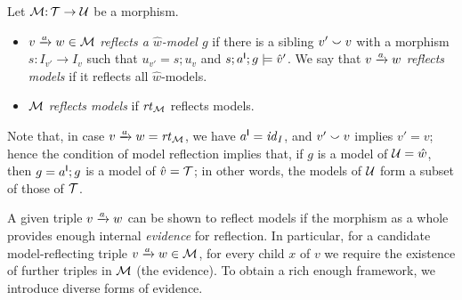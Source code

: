 \begin{definition}
Let ${\mathcal{M}}{:}\, {\mathcal{T}}\rightarrow{\mathcal{U}}$ be a morphism.
\begin{itemize}[topsep=\itemsep]
\item $\trip vaw\in\cM$ \emph{reflects a $\hat w$-model $g$} if there is a sibling $v'\smallsmile v$ with a morphism $s:I_{v'}\to I_v$ such that $u_{v'}=s;u_v$ and $s;a^{\mathsf I};g\models \hat v'$. We say that $\trip vaw$ \emph{reflects models} if it reflects all $\hat w$-models.

\item ${\mathcal{M}}$ \emph{reflects models} if $\mathit{rt}_{{\mathcal{M}}}$ reflects models.
\end{itemize}
\end{definition}
%
Note that, in case $\trip vaw=\rt\cM$, we have $a^{\mathsf I}={\mathit{id}}_I$, and $v'\smallsmile v$ implies $v'=v$; hence the condition of model reflection implies that, if $g$ is a model of ${\mathcal{U}}=\hat w$, then $g=a^{\mathsf I};g$ is a model of $\hat v={\mathcal{T}}$; in other words, the models of ${\mathcal{U}}$ form a subset of those of ${\mathcal{T}}$.

\begin{comment}
\todo[inline]{In fact, we have two versions of model reflection; it currently is unclear which is the ``better''. The difference is that (ordinary) reflection does not impose any requirement on the witnesses, whereas strong reflection requires that the witness of the reflected model is itself a reflected witness of the original model.}
\begin{definition}[strong model reflection]
Let $\cM\of \cT\to\cU$ be a morphism and let $\trip vaw\in\cM$.
\begin{itemize}[topsep=\itemsep]
\item $a$ \emph{reflects a $\hat w$-model $g$ with witness $h$} if $a\I;g\sat \hat v$ with witness $a\P;h$.
	
\item $a$ \emph{strongly reflects models} if $a$ reflects all $\hat w$-model/witness pairs.
		
\item $\cM$ strongly reflects models if $\rt\cM$ reflects models.
\end{itemize}
\end{definition}
%
\todo[inline]{
The first of these, ``ordinary'' reflection, is the property we are really after; at some point we thought that strong reflection would be necessary for building an inductive proof, but currently that seems not to be the case. If that is born out, we can forget about strong reflection.
}
\end{comment}
%
A given triple $\trip vaw$ can be shown to reflect models if the morphism as a whole provides enough internal \emph{evidence} for reflection. In particular, for a candidate model-reflecting triple $\trip vaw\in \cM$, for every child $x$ of $v$ we require the existence of further triples in ${\mathcal{M}}$ (the evidence). To obtain a rich enough framework, we introduce diverse forms of evidence.

